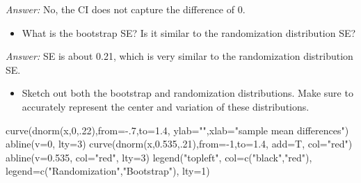 \documentclass[
]{book}
\newenvironment{Shaded}{\begin{snugshade}}{\end{snugshade}}
\newcommand{\AttributeTok}[1]{\textcolor[rgb]{0.77,0.63,0.00}{#1}}
\newcommand{\DecValTok}[1]{\textcolor[rgb]{0.00,0.00,0.81}{#1}}
\newcommand{\FloatTok}[1]{\textcolor[rgb]{0.00,0.00,0.81}{#1}}
\newcommand{\FunctionTok}[1]{\textcolor[rgb]{0.00,0.00,0.00}{#1}}
\newcommand{\NormalTok}[1]{#1}
\newcommand{\SpecialCharTok}[1]{\textcolor[rgb]{0.00,0.00,0.00}{#1}}
\newcommand{\StringTok}[1]{\textcolor[rgb]{0.31,0.60,0.02}{#1}}
\providecommand{\tightlist}{%
  \setlength{\itemsep}{0pt}\setlength{\parskip}{0pt}}
\begin{document}
\emph{Answer:} No, the CI does not capture the difference of 0.

\vspace*{.5in}

\begin{itemize}
\tightlist
\item
  What is the bootstrap SE? Is it similar to the randomization distribution SE?
\end{itemize}

\emph{Answer:} SE is about 0.21, which is very similar to the randomization distribution SE.

\vspace*{.5in}

\begin{itemize}
\tightlist
\item
  Sketch out both the bootstrap and randomization distributions. Make sure to accurately represent the center and variation of these distributions.
\end{itemize}

\begin{Shaded}
\begin{Highlighting}[]
\FunctionTok{curve}\NormalTok{(}\FunctionTok{dnorm}\NormalTok{(x,}\DecValTok{0}\NormalTok{,.}\DecValTok{22}\NormalTok{),}\AttributeTok{from=}\SpecialCharTok{{-}}\NormalTok{.}\DecValTok{7}\NormalTok{,}\AttributeTok{to=}\FloatTok{1.4}\NormalTok{, }\AttributeTok{ylab=}\StringTok{""}\NormalTok{,}\AttributeTok{xlab=}\StringTok{"sample mean differences"}\NormalTok{)}
\FunctionTok{abline}\NormalTok{(}\AttributeTok{v=}\DecValTok{0}\NormalTok{, }\AttributeTok{lty=}\DecValTok{3}\NormalTok{)}
\FunctionTok{curve}\NormalTok{(}\FunctionTok{dnorm}\NormalTok{(x,}\FloatTok{0.535}\NormalTok{,.}\DecValTok{21}\NormalTok{),}\AttributeTok{from=}\SpecialCharTok{{-}}\DecValTok{1}\NormalTok{,}\AttributeTok{to=}\FloatTok{1.4}\NormalTok{, }\AttributeTok{add=}\NormalTok{T, }\AttributeTok{col=}\StringTok{"red"}\NormalTok{)}
\FunctionTok{abline}\NormalTok{(}\AttributeTok{v=}\FloatTok{0.535}\NormalTok{, }\AttributeTok{col=}\StringTok{"red"}\NormalTok{, }\AttributeTok{lty=}\DecValTok{3}\NormalTok{)}
\FunctionTok{legend}\NormalTok{(}\StringTok{"topleft"}\NormalTok{, }\AttributeTok{col=}\FunctionTok{c}\NormalTok{(}\StringTok{"black"}\NormalTok{,}\StringTok{"red"}\NormalTok{), }\AttributeTok{legend=}\FunctionTok{c}\NormalTok{(}\StringTok{"Randomization"}\NormalTok{,}\StringTok{"Bootstrap"}\NormalTok{), }\AttributeTok{lty=}\DecValTok{1}\NormalTok{)}
\end{Highlighting}
\end{Shaded}
\end{document}
